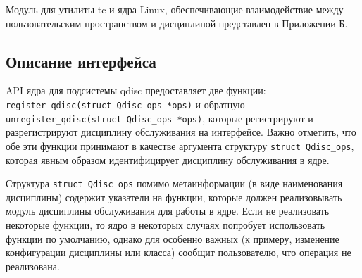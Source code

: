 	Модуль для утилиты {tc} и ядра Linux, обеспечивающие взаимодействие между
	пользовательским пространством и дисциплиной представлен в Приложении Б. 

	\subsection{Описание интерфейса}

	API ядра для подсистемы qdisc предоставляет две функции: \lstinline{register_qdisc(struct Qdisc_ops *ops)}
	и обратную --- \lstinline{unregister_qdisc(struct Qdisc_ops *ops)}, которые регистрируют
	и разрегистрируют дисциплину обслуживания на интерфейсе. Важно отметить, что обе эти
	функции принимают в качестве аргумента структуру \lstinline{struct Qdisc_ops},
	которая явным образом идентифицирует дисциплину обслуживания в ядре.

	Структура \lstinline{struct Qdisc_ops} помимо метаинформации (в виде наименования дисциплины)
	содержит указатели на функции, которые должен реализовывать модуль дисциплины обслуживания
	для работы в ядре. Если не реализовать некоторые функции,
	то ядро в некоторых случаях попробует использовать функции по умолчанию, однако
	для особенно важных (к примеру, изменение конфигурации дисциплины или класса)
	сообщит пользователю, что операция не реализована.

